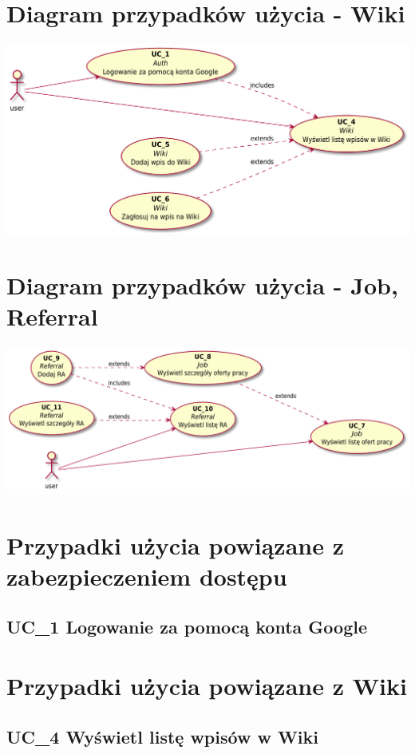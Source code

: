 \documentclass[oneside]{scrreprt}
\begin{document}
\section{Diagram przypadków użycia - Wiki}
\includegraphics[width=\textwidth, keepaspectratio]{graphics/wiki_use_case_diagram.pdf}

\section{Diagram przypadków użycia - Job, Referral}
\includegraphics[width=\textwidth, keepaspectratio]{graphics/job_referral_use_case_diagram.pdf}

\section{Przypadki użycia powiązane z zabezpieczeniem dostępu}
\subsection{UC\_1 Logowanie za pomocą konta Google}

\section{Przypadki użycia powiązane z Wiki}
\subsection{UC\_4 Wyświetl listę wpisów w Wiki}
\end{document}
